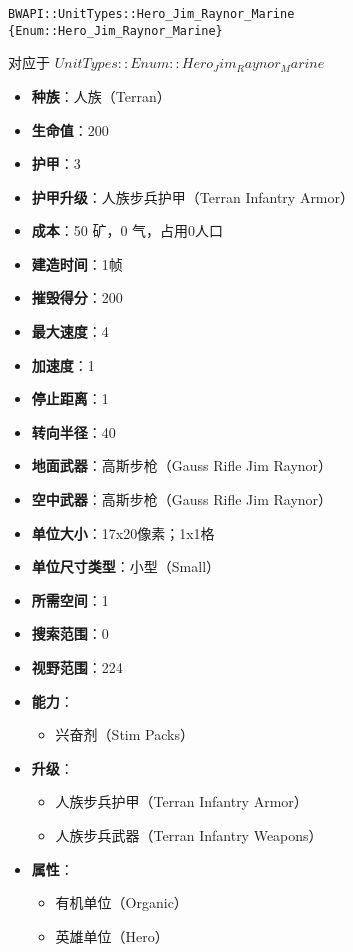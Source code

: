 \begin{tcolorbox}[colback=white, colframe=black!60!white, title=Hero\_Jim\_Raynor\_Marine(), arc=0mm]
    \begin{verbatim}
BWAPI::UnitTypes::Hero_Jim_Raynor_Marine {Enum::Hero_Jim_Raynor_Marine}
    \end{verbatim}
    对应于  $ UnitTypes::Enum::Hero_Jim_Raynor_Marine $ 
    \begin{itemize}
        \item \textbf{种族}：人族（Terran）
        \item \textbf{生命值}：200
        \item \textbf{护甲}：3
        \item \textbf{护甲升级}：人族步兵护甲（Terran Infantry Armor）
        \item \textbf{成本}：50 矿，0 气，占用0人口
        \item \textbf{建造时间}：1帧
        \item \textbf{摧毁得分}：200
        \item \textbf{最大速度}：4
        \item \textbf{加速度}：1
        \item \textbf{停止距离}：1
        \item \textbf{转向半径}：40
        \item \textbf{地面武器}：高斯步枪（Gauss Rifle Jim Raynor）
        \item \textbf{空中武器}：高斯步枪（Gauss Rifle Jim Raynor）
        \item \textbf{单位大小}：17x20像素；1x1格
        \item \textbf{单位尺寸类型}：小型（Small）
        \item \textbf{所需空间}：1
        \item \textbf{搜索范围}：0
        \item \textbf{视野范围}：224
        \item \textbf{能力}：
            \begin{itemize}
                \item 兴奋剂（Stim Packs）
            \end{itemize}
        \item \textbf{升级}：
            \begin{itemize}
                \item 人族步兵护甲（Terran Infantry Armor）
                \item 人族步兵武器（Terran Infantry Weapons）
            \end{itemize}
        \item \textbf{属性}：
            \begin{itemize}
                \item 有机单位（Organic）
                \item 英雄单位（Hero）
            \end{itemize}
    \end{itemize}
\end{tcolorbox}

